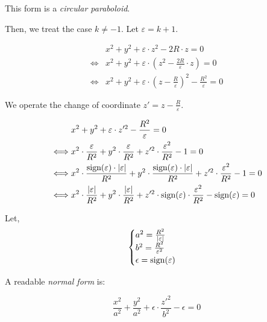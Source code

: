 This form is a \emph{circular paraboloid}.

Then, we treat the case $k \neq -1$. Let $\varepsilon = k + 1$.

\begin{equation} \begin{split}
& x^2 + y^2 + \varepsilon \cdot z^2 - 2 R \cdot z = 0 \\
\iff & x^2 + y^2 + \varepsilon \cdot \left( z^2 - \frac{2R}{\varepsilon} \cdot z\right) = 0 \\
\iff & x^2 + y^2 + \varepsilon \cdot \left( z - \frac{R}{\varepsilon} \right)^2 - \frac{R^2}{\varepsilon}
       = 0
\end{split} \end{equation}

We operate the change of coordinate $z' = z - \frac{R}{\varepsilon}$.

\begin{equation} \begin{split}
& x^2 + y^2 + \varepsilon \cdot z'^2 - \frac{R^2}{\varepsilon} = 0 \\
\iff & x^2 \cdot \frac{\varepsilon}{R^2} + y^2 \cdot \frac{\varepsilon}{R^2} +
       z'^2 \cdot \frac{\varepsilon^2}{R^2} - 1 = 0 \\
\iff & x^2 \cdot \frac{\textrm{sign}(\varepsilon) \cdot \abs{\varepsilon}}{R^2} +
       y^2 \cdot \frac{\textrm{sign}(\varepsilon) \cdot \abs{\varepsilon}}{R^2} +
       z'^2 \cdot \frac{\varepsilon^2}{R^2} - 1 = 0 \\
\iff & x^2 \cdot \frac{\abs{\varepsilon}}{R^2} + y^2 \cdot \frac{\abs{\varepsilon}}{R^2} +
       z'^2 \cdot \textrm{sign}(\varepsilon) \cdot \frac{\varepsilon^2}{R^2} - \textrm{sign}(\varepsilon)
       = 0
\end{split} \end{equation}

Let,
\begin{equation} \begin{cases}
a^2 = \frac{R^2}{\abs{\varepsilon}} \\
b^2 = \frac{R^2}{\varepsilon^2} \\
\epsilon = \textrm{sign}(\varepsilon)
\end{cases} \end{equation}

A readable \emph{normal form} is:

\begin{equation}
\frac{x^2}{a^2} + \frac{y^2}{a^2} + \epsilon \cdot \frac{z'^2}{b^2} - \epsilon
  = 0
\end{equation}

